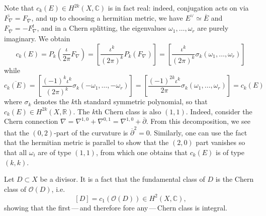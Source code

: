 \documentclass[11pt]{amsart}
\newcommand{\cO}{\mathcal{O}}
\newcommand{\R}{\mathbb R}
\newcommand{\C}{\mathbb C}
\newcommand{\brk}[1]{\!\left[#1\right]}
\theoremstyle{definition}
\numberwithin{equation}{section}
\begin{document}
Note that $c_k(E)\in H^{2k}(X,\C)$ is in fact real: indeed, conjugation acts on via $\overline{F_\nabla}=F_{\overline\nabla}$, and up to choosing a hermitian metric, we have $E^\vee\simeq \overline E$ and $F_{\overline\nabla}=-F_\nabla^t$, and in a Chern splitting, the eigenvalues $\omega_1,\dots,\omega_r$ are purely imaginary. We obtain
\[c_k(E)=P_k(\frac{\iota}{2\pi}F_\nabla)=\brk{\frac{\iota^k}{(2\pi)^k}P_k(F_\nabla)}=\brk{\frac{\iota^k}{(2\pi)^k}\sigma_k(\omega_1,\dots,\omega_r)}
\]
while
\[
\overline{c_k(E)}=\brk{\frac{(-1)^k\iota ^k}{(2\pi)^k}\sigma_k(-\omega_1,\dots,-\omega_r)}=\brk{\frac{(-1)^{2k}\iota^k}{2\pi}\sigma_k(\omega_1,\dots,\omega_r)}=c_k(E)
\]
where $\sigma_k$ denotes the $k$th standard symmetric polynomial, so that $c_k(E)\in H^{2k}(X,\R)$. The $k$th Chern class is also $(1,1)$. Indeed, consider the Chern connection $\nabla=\nabla^{1,0}+\nabla^{0,1}=\nabla^{1,0}+\overline\partial$. From this decomposition, we see that the $(0,2)$-part of the curvature is $\overline\partial^2=0$. Similarly, one can use the fact that the hermitian metric is parallel to show that the $(2,0)$ part vanishes so that all $\omega_i$ are of type $(1,1)$, from which one obtains that $c_k(E)$ is of type $(k,k)$.

Let $D\subset X$ be a divisor. It is a fact that the fundamental class of $D$ is the Chern class of $\cO(D)$, i.e.
\[
[D]=c_1(\cO(D))\in H^{2}(X,\C),
\]
showing that the first\,---\,and therefore fore any\,---\,Chern class is integral.
\end{document}
